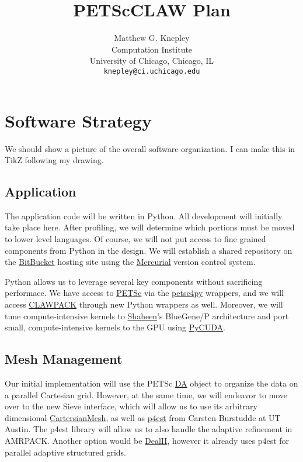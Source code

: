 \documentclass[12pt]{article}
\title{PETScCLAW Plan}
\author{Matthew G. Knepley\\
\small Computation Institute\\[-0.8ex]
\small University of Chicago, Chicago, IL\\
\small \texttt{knepley@ci.uchicago.edu}\\
}
\begin{document}
\maketitle

\section{Software Strategy}

  We should show a picture of the overall software organization. I can make this in TikZ following my drawing.

\subsection{Application}

The application code will be written in Python. All development will initially take place here. After profiling, we
will determine which portions must be moved to lower level languages. Of course, we will not put access to fine grained
components from Python in the design. We will establish a shared repository on the
\href{http://www.bitbucket.org}{BitBucket} hosting site using the \href{http://mercurial.selenic.com}{Mercurial} version
control system.

Python allows us to leverage several key components without sacrificing performace. We have access to
\href{http://www.mcs.anl.gov/petsc}{PETSc} via the \href{http://code.google.com/p/petsc4py}{petsc4py} wrappers, and we
will access \href{http://www.amath.washington.edu/~claw/clawpack.org}{CLAWPACK} through new Python wrappers as
well. Moreover, we will tune compute-intensive kernels to \href{http://www.hpc.kaust.edu.sa/wiki/shaheen/}{Shaheen}'s 
BlueGene/P architecture and port small, compute-intensive kernels to the GPU using
\href{http://mathema.tician.de/software/pycuda}{PyCUDA}.

\subsection{Mesh Management}

Our initial implementation will use the PETSc
\href{http://www.mcs.anl.gov/petsc/petsc-as/snapshots/petsc-current/docs/manualpages/DA/index.html}{DA} object to
organize the data on a parallel Cartesian grid. However, at the same time, we will endeavor to move over to the new
Sieve interface, which will allow us to use its arbitrary dimensional \href{}{CartersianMesh}, as well as \href{}{p4est}
from Carsten Burstudde at UT Austin. The p4est library will allow us to also handle the adaptive refinement in
AMRPACK. Another option would be \href{}{DealII}, however it already uses p4est for parallel adaptive structured grids.
\end{document}
